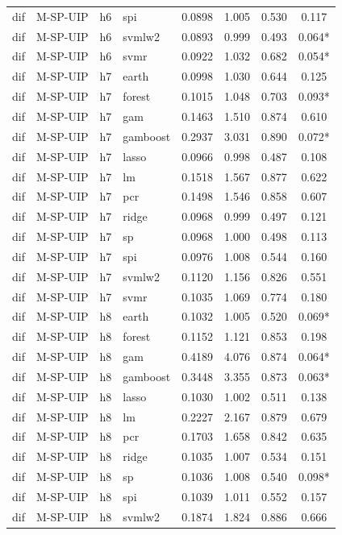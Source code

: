 \begin{ThreePartTable}
\begin{longtable}[t]{llclcccc}
dif & M-SP-UIP & h6 & spi & 0.0898 & 1.005 & 0.530 & 0.117\\
dif & M-SP-UIP & h6 & svmlw2 & 0.0893 & 0.999 & 0.493 & 0.064*\\
dif & M-SP-UIP & h6 & svmr & 0.0922 & 1.032 & 0.682 & 0.054*\\
\addlinespace
dif & M-SP-UIP & h7 & earth & 0.0998 & 1.030 & 0.644 & 0.125\\
dif & M-SP-UIP & h7 & forest & 0.1015 & 1.048 & 0.703 & 0.093*\\
dif & M-SP-UIP & h7 & gam & 0.1463 & 1.510 & 0.874 & 0.610\\
dif & M-SP-UIP & h7 & gamboost & 0.2937 & 3.031 & 0.890 & 0.072*\\
dif & M-SP-UIP & h7 & lasso & 0.0966 & 0.998 & 0.487 & 0.108\\
dif & M-SP-UIP & h7 & lm & 0.1518 & 1.567 & 0.877 & 0.622\\
dif & M-SP-UIP & h7 & pcr & 0.1498 & 1.546 & 0.858 & 0.607\\
dif & M-SP-UIP & h7 & ridge & 0.0968 & 0.999 & 0.497 & 0.121\\
dif & M-SP-UIP & h7 & sp & 0.0968 & 1.000 & 0.498 & 0.113\\
dif & M-SP-UIP & h7 & spi & 0.0976 & 1.008 & 0.544 & 0.160\\
dif & M-SP-UIP & h7 & svmlw2 & 0.1120 & 1.156 & 0.826 & 0.551\\
dif & M-SP-UIP & h7 & svmr & 0.1035 & 1.069 & 0.774 & 0.180\\
\addlinespace
dif & M-SP-UIP & h8 & earth & 0.1032 & 1.005 & 0.520 & 0.069*\\
dif & M-SP-UIP & h8 & forest & 0.1152 & 1.121 & 0.853 & 0.198\\
dif & M-SP-UIP & h8 & gam & 0.4189 & 4.076 & 0.874 & 0.064*\\
dif & M-SP-UIP & h8 & gamboost & 0.3448 & 3.355 & 0.873 & 0.063*\\
dif & M-SP-UIP & h8 & lasso & 0.1030 & 1.002 & 0.511 & 0.138\\
dif & M-SP-UIP & h8 & lm & 0.2227 & 2.167 & 0.879 & 0.679\\
dif & M-SP-UIP & h8 & pcr & 0.1703 & 1.658 & 0.842 & 0.635\\
dif & M-SP-UIP & h8 & ridge & 0.1035 & 1.007 & 0.534 & 0.151\\
dif & M-SP-UIP & h8 & sp & 0.1036 & 1.008 & 0.540 & 0.098*\\
dif & M-SP-UIP & h8 & spi & 0.1039 & 1.011 & 0.552 & 0.157\\
dif & M-SP-UIP & h8 & svmlw2 & 0.1874 & 1.824 & 0.886 & 0.666\\

\end{longtable}
\end{ThreePartTable}
